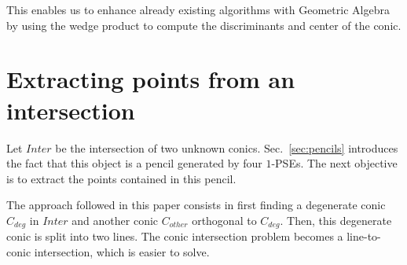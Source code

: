 \documentclass{birkjour}
\begin{document}
\noindent This enables us to enhance already existing algorithms with Geometric Algebra by using the wedge product to compute the discriminants and center of the conic.

\section{Extracting points from an intersection}
\label{sec:extraction}
Let \(Inter\) be the intersection of two unknown conics. Sec.~\ref{sec:pencils} introduces the fact that this object is a pencil generated by four \(1\)-PSEs. The next objective is to extract the points contained in this pencil. 

The approach followed in this paper consists in first finding a degenerate conic \(C_{deg}\) in \(Inter\) and another conic \(C_{other}\) orthogonal to \(C_{deg}\). Then, this degenerate conic is split into two lines. The conic intersection problem becomes a line-to-conic intersection, which is easier to solve.
\end{document}

